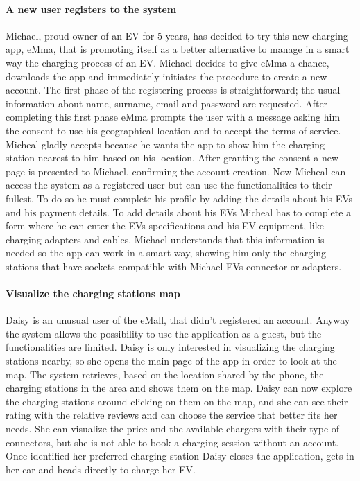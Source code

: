 \paragraph{A new user registers to the system}
Michael, proud owner of an EV for 5 years, has decided to try this new charging app, eMma, that is promoting itself as a better alternative to manage in a smart way the charging process of an EV. Michael decides to give eMma a chance, downloads the app and immediately initiates the procedure to create a new account. The first phase of the registering process is straightforward; the usual information about name, surname, email and password are requested. After completing this first phase eMma prompts the user with a message asking him the consent to use his geographical location and to accept the terms of service. Micheal gladly accepts because he wants the app to show him the charging station nearest to him based on his location. After granting the consent a new page is presented to Michael, confirming the account creation. Now Micheal can access the system as a registered user but can use the functionalities to their fullest. To do so he must complete his profile by adding the details about his EVs and his payment details. To add details about his EVs Micheal has to complete a form where he can enter the EVs specifications and his EV equipment, like charging adapters and cables. Michael understands that this information is needed so the app can work in a smart way, showing him only the charging stations that have sockets compatible with Michael EVs connector or adapters.

\paragraph{Visualize the charging stations map}
Daisy is an unusual user of the eMall, that didn't registered an account. Anyway the system allows the possibility to use the application as a guest, but the functionalities are limited. Daisy is only interested in visualizing the charging stations nearby, so she opens the main page of the app in order to look at the map. The system retrieves, based on the location shared by the phone, the charging stations in the area and shows them on the map. Daisy can now explore the charging stations around clicking on them on the map, and she can see their rating with the relative reviews and can choose the service that better fits her needs. She can visualize the price and the available chargers with their type of connectors, but she is not able to book a charging session without an account. Once identified her preferred charging station Daisy closes the application, gets in her car and heads directly to charge her EV.

